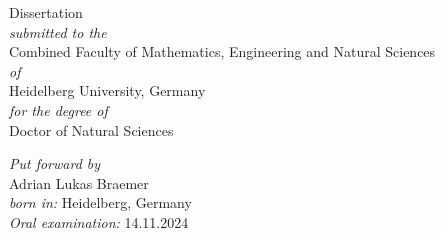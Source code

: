 \thispagestyle{empty}
\begin{addmargin}[-1cm]{-3cm}
\begin{center}
\large




\LARGE
Dissertation\\
\vspace{1cm}
\large
\textit{submitted to the}\\\vspace{0.5cm}
Combined Faculty of Mathematics, Engineering and Natural Sciences\\\vspace{0.5cm}
\textit{of}\\\vspace{0.5cm}
Heidelberg University, Germany\\\vspace{0.5cm}
\textit{for the degree of}\\\vspace{0.5cm}
Doctor of Natural Sciences

\vfill

\textit{Put forward by}\\\vspace{0.5cm}
Adrian Lukas Braemer\\\vspace{0.5cm}
\textit{born in:} Heidelberg, Germany\\\vspace{0.5cm}
\textit{Oral examination:} 14.11.2024



\end{center}
\end{addmargin}